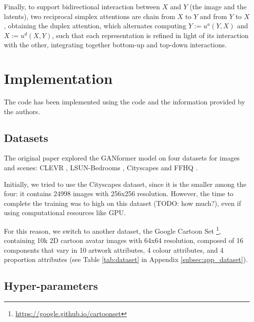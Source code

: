 \documentclass{article}
\begin{document}
	Finally, to support bidirectional interaction between $X$ and $Y$ (the image and the latents), two 
	reciprocal simplex attentions are chain from $X$ to $Y$ and from $Y$ to $X$, obtaining the duplex 
	attention, which alternates computing $Y :=u^a(Y,X)$ and $X:=u^d(X,Y)$, such that each 
	representation is refined in light of its interaction with the other, integrating together bottom-up and 
	top-down interactions.
	
	\section{Implementation}
	
	The code has been implemented using the code and the information provided by the authors.
	
	\subsection{Datasets}	\label{sec:dataset}
	The original paper \cite{hudson2021generative} explored the GANformer model on four datasets for 
	images and scenes: CLEVR \cite{johnson2017clevr}, LSUN-Bedrooms \cite{yu2015lsun}, Cityscapes 
	\cite{cordts2016cityscapes} and FFHQ \cite{karras2019style}. 
	
	Initially, we tried to use the Cityscapes dataset, since it is the smaller among the four: it contains 
	24998 images with 256x256 resolution. 
	However, the time to complete the training was to high on this dataset (TODO: how much?), even if 
	using computational resources like GPU.
	
	For this reason, we switch to another dataset, the Google Cartoon Set \cite{cartoonset}\footnote{	
	\url{https://google.github.io/cartoonset}}, containing 10k 2D cartoon avatar 
	images with 64x64 resolution, composed of 16 components that vary in 10 artwork attributes, 4 
	colour attributes, and 4 proportion attributes (see Table \ref{tab:dataset} in Appendix 
	\ref{subsec:app_dataset}). 

	\subsection{Hyper-parameters}\label{sec:hyperparam}%
	
\end{document}
